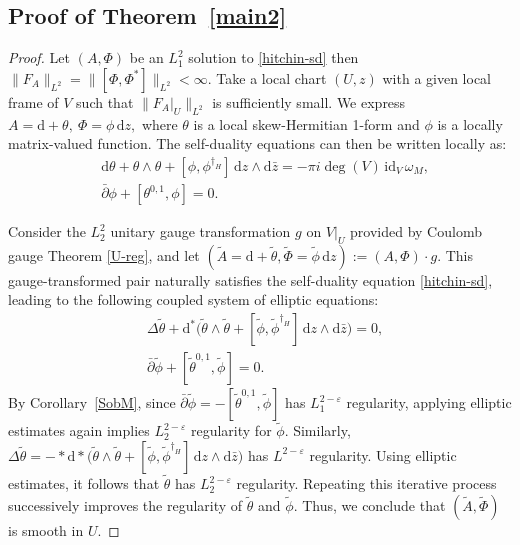 \documentclass[a4paper]{amsart}
\theoremstyle{definition}
\theoremstyle{remark}
\numberwithin{equation}{section}
\begin{document}
\subsection{Proof of Theorem~\ref{main2}}
\begin{proof}
Let $(A, \Phi)$ be an $L_1^2$ solution to \eqref{hitchin-sd} then $\|F_A\|_{L^2} = \|[\Phi, \Phi^*]\|_{L^2} < \infty.$ Take a local chart $(U, z)$ with a given local frame of $V$ such that $\|F_A|_U\|_{L^2}$ is sufficiently small. We express $A = \mathrm{d} + \theta, ~ \Phi = \phi \, \mathrm{d}z,$ where $\theta$ is a local skew-Hermitian 1-form and $\phi$ is a locally matrix-valued function. The self-duality equations can then be written locally as:
\begin{align*}
&\text{d}\theta + \theta \wedge \theta + [\phi, \phi^{\dagger_H}] \, \text{d}z \wedge \text{d}\bar{z} = -\pi i \deg(V) \, \text{id}_V \, \omega_M, \\
&\bar{\partial} \phi + [\theta^{0,1}, \phi] = 0.
\end{align*}

Consider the $L_2^2$ unitary gauge transformation $g$ on $V|_U$ provided by Coulomb gauge Theorem \ref{U-reg}, and let $(\tilde{A} = \text{d} + \tilde{\theta}, \tilde{\Phi} = \tilde{\phi} \, \text{d}z) := (A, \Phi) \cdot g$. This gauge-transformed pair naturally satisfies the self-duality equation \eqref{hitchin-sd}, leading to the following coupled system of elliptic equations:
\begin{align*}
&\Delta \tilde{\theta} + \text{d}^* \Big(\tilde{\theta} \wedge \tilde{\theta} + [\tilde{\phi}, \tilde{\phi}^{\dagger_H}] \, \text{d}z \wedge \text{d}\bar{z}\Big) = 0, \\
&\bar{\partial} \tilde{\phi} + [\tilde{\theta}^{0,1}, \tilde{\phi}] = 0.
\end{align*}
By Corollary~\ref{SobM}, since $\bar{\partial} \tilde{\phi} = -[\tilde{\theta}^{0,1}, \tilde{\phi}]$ has $L_1^{2 - \varepsilon}$ regularity, applying elliptic estimates again implies $L_2^{2 - \varepsilon}$ regularity for $\tilde{\phi}$. Similarly, $\Delta \tilde{\theta} = -*\mathrm{d}*\Big(\tilde{\theta} \wedge \tilde{\theta} + [\tilde{\phi}, \tilde{\phi}^{\dagger_H}] \, \mathrm{d}z \wedge \mathrm{d}\bar{z}\Big)$ has $L^{2 - \varepsilon}$ regularity. Using elliptic estimates, it follows that $\tilde{\theta}$ has $L_2^{2 - \varepsilon}$ regularity. Repeating this iterative process successively improves the regularity of $\tilde{\theta}$ and $\tilde{\phi}$. Thus, we conclude that $(\tilde{A}, \tilde{\Phi})$ is smooth in $U$.


\end{proof}
\end{document}
